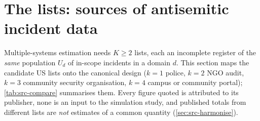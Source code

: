 \section{The lists: sources of antisemitic incident data}\label{sec:sources}

Multiple-systems estimation needs $K\ge2$ lists, each an incomplete register of the \emph{same} population $U_d$ of in-scope incidents in a domain $d$. This section maps the candidate US lists onto the canonical design ($k=1$ police, $k=2$ NGO audit, $k=3$ community security organisation, $k=4$ campus or community portal); \cref{tab:src-compare} summarises them. Every figure quoted is attributed to its publisher, none is an input to the simulation study, and published totals from different lists are \emph{not} estimates of a common quantity (\cref{sec:src-harmonise}).


